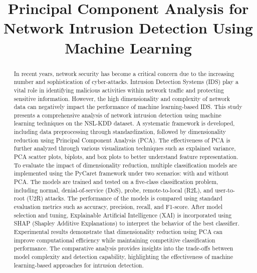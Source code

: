 \documentclass[conference]{IEEEtran}
\begin{document}
\title{Principal Component Analysis for Network Intrusion Detection Using Machine Learning\\

}

\author{
}

\maketitle

\begin{abstract}
In recent years, network security has become a critical concern due to the increasing number and sophistication of cyber-attacks. Intrusion Detection Systems (IDS) play a vital role in identifying malicious activities within network traffic and protecting sensitive information. However, the high dimensionality and complexity of network data can negatively impact the performance of machine learning-based IDS. This study presents a comprehensive analysis of network intrusion detection using machine learning techniques on the NSL-KDD dataset. A systematic framework is developed, including data preprocessing through standardization, followed by dimensionality reduction using Principal Component Analysis (PCA). The effectiveness of PCA is further analyzed through various visualization techniques such as explained variance, PCA scatter plots, biplots, and box plots to better understand feature representation. To evaluate the impact of dimensionality reduction, multiple classification models are implemented using the PyCaret framework under two scenarios: with and without PCA. The models are trained and tested on a five-class classification problem, including normal, denial-of-service (DoS), probe, remote-to-local (R2L), and user-to-root (U2R) attacks. The performance of the models is compared using standard evaluation metrics such as accuracy, precision, recall, and F1-score. After model selection and tuning, Explainable Artificial Intelligence (XAI) is incorporated using SHAP (Shapley Additive Explanations) to interpret the behavior of the best classifier. Experimental results demonstrate that dimensionality reduction using PCA can improve computational efficiency while maintaining competitive classification performance. The comparative analysis provides insights into the trade-offs between model complexity and detection capability, highlighting the effectiveness of machine learning-based approaches for intrusion detection.
\end{abstract}
\end{document}

